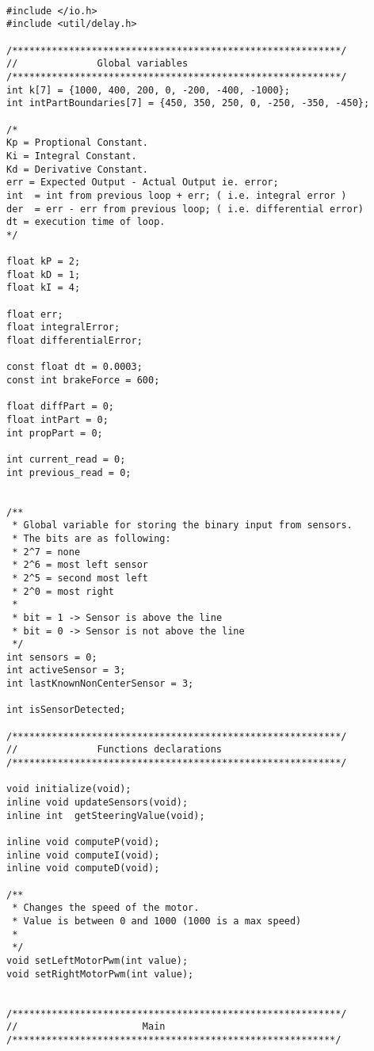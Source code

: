 \begin{verbatim}

#include </io.h>
#include <util/delay.h>

/**********************************************************/
//				Global variables
/**********************************************************/
int k[7] = {1000, 400, 200, 0, -200, -400, -1000};
int intPartBoundaries[7] = {450, 350, 250, 0, -250, -350, -450};

/*
Kp = Proptional Constant.
Ki = Integral Constant.
Kd = Derivative Constant.
err = Expected Output - Actual Output ie. error;
int  = int from previous loop + err; ( i.e. integral error )
der  = err - err from previous loop; ( i.e. differential error)
dt = execution time of loop.
*/

float kP = 2; 
float kD = 1;
float kI = 4;

float err;
float integralError;
float differentialError;

const float dt = 0.0003; 
const int brakeForce = 600;

float diffPart = 0;
float intPart = 0;
int propPart = 0;

int current_read = 0;
int previous_read = 0;


/**
 * Global variable for storing the binary input from sensors.
 * The bits are as following:
 * 2^7 = none
 * 2^6 = most left sensor
 * 2^5 = second most left
 * 2^0 = most right
 *
 * bit = 1 -> Sensor is above the line
 * bit = 0 -> Sensor is not above the line
 */
int sensors = 0;
int activeSensor = 3;
int lastKnownNonCenterSensor = 3;

int isSensorDetected;

/**********************************************************/
//				Functions declarations
/**********************************************************/

void initialize(void);
inline void updateSensors(void);
inline int  getSteeringValue(void);

inline void computeP(void); 
inline void computeI(void);
inline void computeD(void);

/**
 * Changes the speed of the motor.
 * Value is between 0 and 1000 (1000 is a max speed)
 *
 */
void setLeftMotorPwm(int value);
void setRightMotorPwm(int value);


/**********************************************************/
//						Main
/*********************************************************/


\end{verbatim}
